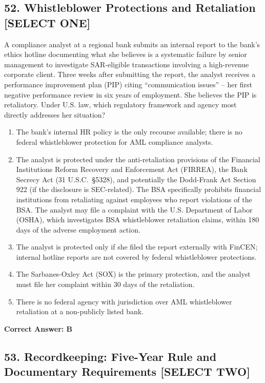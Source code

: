 \documentclass[11pt,a4paper]{article}
\begin{document}
	\subsection{52. Whistleblower Protections and Retaliation \textnormal{[SELECT ONE]}}
	
	A compliance analyst at a regional bank submits an internal report to the bank's ethics hotline documenting what she believes is a systematic failure by senior management to investigate SAR-eligible transactions involving a high-revenue corporate client. Three weeks after submitting the report, the analyst receives a performance improvement plan (PIP) citing ``communication issues'' -- her first negative performance review in six years of employment. She believes the PIP is retaliatory. Under U.S. law, which regulatory framework and agency most directly addresses her situation?
	
	\begin{enumerate}[label=\Alph*.]
		\item The bank's internal HR policy is the only recourse available; there is no federal whistleblower protection for AML compliance analysts.
		\item The analyst is protected under the anti-retaliation provisions of the Financial Institutions Reform Recovery and Enforcement Act (FIRREA), the Bank Secrecy Act (31 U.S.C.\ \S 5328), and potentially the Dodd-Frank Act Section 922 (if the disclosure is SEC-related). The BSA specifically prohibits financial institutions from retaliating against employees who report violations of the BSA. The analyst may file a complaint with the U.S. Department of Labor (OSHA), which investigates BSA whistleblower retaliation claims, within 180 days of the adverse employment action.
		\item The analyst is protected only if she filed the report externally with FinCEN; internal hotline reports are not covered by federal whistleblower protections.
		\item The Sarbanes-Oxley Act (SOX) is the primary protection, and the analyst must file her complaint within 30 days of the retaliation.
		\item There is no federal agency with jurisdiction over AML whistleblower retaliation at a non-publicly listed bank.
	\end{enumerate}
	\textbf{Correct Answer: B}
	
	\subsection{53. Recordkeeping: Five-Year Rule and Documentary Requirements \textnormal{[SELECT TWO]}}
	
\end{document}

